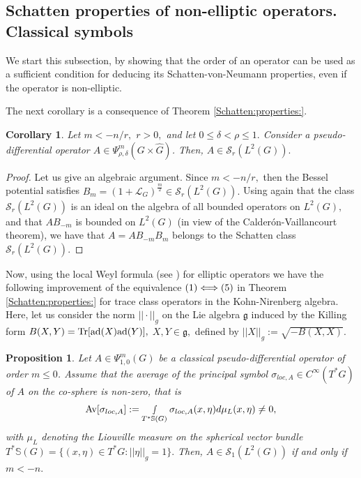 \documentclass[12pt, reqno]{amsart}
\newtheorem{proposition}[theorem]{Proposition}
\newtheorem{corollary}[theorem]{Corollary}
\theoremstyle{definition}
\theoremstyle{remark}
\numberwithin{equation}{section}
\begin{document}
\subsection{Schatten properties of non-elliptic operators. Classical symbols}\label{ClassicalSection}



We start this subsection, by showing that the order of an operator can be used as a sufficient condition  for  deducing its Schatten-von-Neumann properties, even if the operator is non-elliptic. 

The next corollary is a consequence of Theorem \ref{Schatten:properties:}.

\begin{corollary}\label{Schatten:properties:cor}  Let $m<-n/r,$  $r>0, $ and let $0\leq \delta<\rho\leq 1.$ Consider a pseudo-differential operator $A\in \Psi^m_{\rho,\delta}(G\times \widehat{G})$. Then, $A\in \mathscr{S}_{r}(L^2(G)).$
\end{corollary}
\begin{proof}
    Let us give an algebraic argument. Since $m<-n/r,$ then the Bessel potential satisfies $B_{m}=(1+\mathcal{L}_G)^{\frac{m}{2}}\in \mathscr{S}_{r}(L^2(G)).$ Using again that the class $\mathscr{S}_{r}(L^2(G))$ is an ideal on the algebra of all bounded operators on $L^2(G),$ and that $AB_{-m}$ is bounded on $L^2(G)$ (in view of the Calder\'on-Vaillancourt theorem), we have that $A=AB_{-m} B_{m}$ belongs to the Schatten class $\mathscr{S}_{r}(L^2(G)).$
\end{proof}
Now, using the local Weyl formula (see  \cite[Theorem 1.1]{CardonaDelgadoRuzhanksyLOcalWeyl}) for elliptic operators we have the following improvement of the equivalence $\textnormal{(1)}\Longleftrightarrow \textnormal{(5)} $ in Theorem \ref{Schatten:properties:} for trace class operators in the Kohn-Nirenberg algebra. Here,  let us consider  the norm $|| \cdot ||_{g}$ on the Lie algebra $\mathfrak{g}$ induced by the Killing form $B(X,Y)=\textnormal{Tr}[\textnormal{ad}(X)\textnormal{ad}(Y)],$ $X,Y\in\mathfrak{g},  $ defined by  $|| X ||_{g}:=\sqrt{-B(X,X)}.$
\begin{proposition}\label{Invariance:trace} Let $A\in \Psi^{m}_{1,0}(G)$ be a classical  pseudo-differential operator of order $m\leq 0$. Assume that the average of the principal symbol $\sigma_{loc,A}\in C^\infty(T^*G)$ of $A$ on the co-sphere is non-zero, that is
\begin{equation}\label{Average:symbol}
    \textnormal{Av}[\sigma_{loc,A}]:=\smallint\limits_{ T^{*}\mathbb{S}(G)}\sigma_{loc,A}(x,\eta)d\mu_{L}(x,\eta)\neq 0,
\end{equation}
with $\mu_{L}$ denoting the Liouville measure on the spherical vector bundle $T^*\mathbb{S}(G)=\{(x,\eta)\in T^*G:||\eta||_g=1\}.$    Then, $A\in \mathscr{S}_1(L^2(G))$ if and only if $m<-n.$    
\end{proposition}
\end{document}
